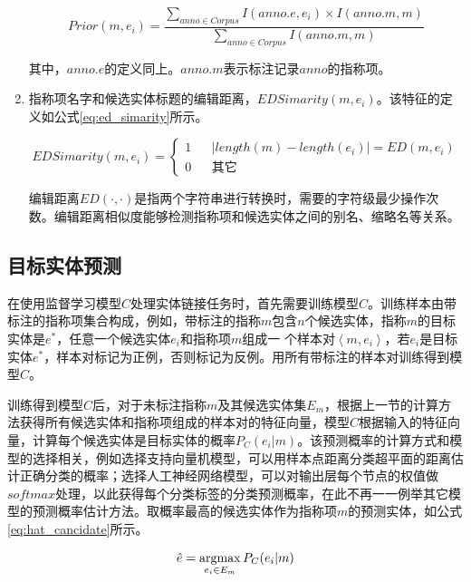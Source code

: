 \begin{enumerate}
{		\begin{equation}\label{eq:prior}
		Prior(m,e_i)=\frac{\sum_{anno \in Corpus} {I(anno.e,e_i)\times I(anno.m,m)}}{\sum_{anno \in Corpus} {I(anno.m,m)}}
		\end{equation}
		
		其中，$anno.e$的定义同上。$anno.m$表示标注记录$anno$的指称项。
	}
	\item 指称项名字和候选实体标题的编辑距离，$EDSimarity(m,e_i)$。该特征的定义如公式\ref{eq:ed_simarity}所示。
	
	\begin{equation}\label{eq:ed_simarity}
	EDSimarity(m,e_i)=
	\left\{
	\begin{array}{rcl}
	1       &      & {|length(m)-length(e_i)|=ED(m,e_i)}\\
	0    &      & {\text{其它}}
	\end{array} \right.
	\end{equation}
	
	编辑距离$ED(\cdot,\cdot)$是指两个字符串进行转换时，需要的字符级最少操作次数。编辑距离相似度能够检测指称项和候选实体之间的别名、缩略名等关系。
\end{enumerate}

\subsection{目标实体预测}
在使用监督学习模型$C$处理实体链接任务时，首先需要训练模型$C$。训练样本由带标注的指称项集合构成，例如，带标注的指称$m$包含$n$个候选实体，指称$m$的目标实体是$e^*$，任意一个候选实体$e_i$和指称项$m$组成一 个样本对$\left\langle m,e_i\right\rangle $，若$e_i$是目标实体$e^*$，样本对标记为正例，否则标记为反例。用所有带标注的样本对训练得到模型$C$。

训练得到模型$C$后，对于未标注指称$m$及其候选实体集$E_m$，根据上一节的计算方法获得所有候选实体和指称项组成的样本对的特征向量，模型$C$根据输入的特征向量，计算每个候选实体是目标实体的概率$P_C(e_i|m)$。该预测概率的计算方式和模型的选择相关，例如选择支持向量机模型，可以用样本点距离分类超平面的距离估计正确分类的概率\cite{李航2012统计学习方法}；选择人工神经网络模型，可以对输出层每个节点的权值做$softmax$处理，以此获得每个分类标签的分类预测概率\cite{ravuri2016comparative}，在此不再一一例举其它模型的预测概率估计方法。取概率最高的候选实体作为指称项$m$的预测实体，如公式\ref{eq:hat_cancidate}所示。

\begin{equation}\label{eq:hat_cancidate}
\hat{e}=\operatorname*{argmax}_{e_i\in E_m} P_C(e_i|m)
\end{equation}

